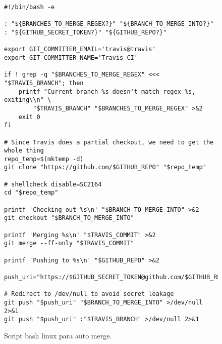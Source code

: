 \begin{figure}[!ht]
  \caption{Script bash linux para auto merge.}
  \label{fig:sc1}

  \begin{lstlisting}
#!/bin/bash -e

: "${BRANCHES_TO_MERGE_REGEX?}" "${BRANCH_TO_MERGE_INTO?}"
: "${GITHUB_SECRET_TOKEN?}" "${GITHUB_REPO?}"

export GIT_COMMITTER_EMAIL='travis@travis'
export GIT_COMMITTER_NAME='Travis CI'

if ! grep -q "$BRANCHES_TO_MERGE_REGEX" <<< "$TRAVIS_BRANCH"; then
    printf "Current branch %s doesn't match regex %s, exiting\\n" \
        "$TRAVIS_BRANCH" "$BRANCHES_TO_MERGE_REGEX" >&2
    exit 0
fi

# Since Travis does a partial checkout, we need to get the whole thing
repo_temp=$(mktemp -d)
git clone "https://github.com/$GITHUB_REPO" "$repo_temp"

# shellcheck disable=SC2164
cd "$repo_temp"

printf 'Checking out %s\n' "$BRANCH_TO_MERGE_INTO" >&2
git checkout "$BRANCH_TO_MERGE_INTO"

printf 'Merging %s\n' "$TRAVIS_COMMIT" >&2
git merge --ff-only "$TRAVIS_COMMIT"

printf 'Pushing to %s\n' "$GITHUB_REPO" >&2

push_uri="https://$GITHUB_SECRET_TOKEN@github.com/$GITHUB_REPO"

# Redirect to /dev/null to avoid secret leakage
git push "$push_uri" "$BRANCH_TO_MERGE_INTO" >/dev/null 2>&1
git push "$push_uri" :"$TRAVIS_BRANCH" >/dev/null 2>&1
  \end{lstlisting}

\end{figure}
